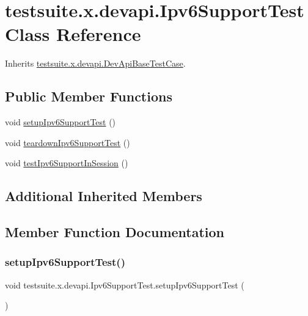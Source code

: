 \hypertarget{classtestsuite_1_1x_1_1devapi_1_1_ipv6_support_test}{}\section{testsuite.\+x.\+devapi.\+Ipv6\+Support\+Test Class Reference}
\label{classtestsuite_1_1x_1_1devapi_1_1_ipv6_support_test}


Inherits \mbox{\hyperlink{classtestsuite_1_1x_1_1devapi_1_1_dev_api_base_test_case}{testsuite.\+x.\+devapi.\+Dev\+Api\+Base\+Test\+Case}}.

\subsection*{Public Member Functions}
\begin{DoxyCompactItemize}
\item 
void \mbox{\hyperlink{classtestsuite_1_1x_1_1devapi_1_1_ipv6_support_test_a38aacbbc480f9b7500c4f727641be981}{setup\+Ipv6\+Support\+Test}} ()
\item 
void \mbox{\hyperlink{classtestsuite_1_1x_1_1devapi_1_1_ipv6_support_test_a34e03da98716f0156b07ebc05bf39dfb}{teardown\+Ipv6\+Support\+Test}} ()
\item 
void \mbox{\hyperlink{classtestsuite_1_1x_1_1devapi_1_1_ipv6_support_test_ad44a8fcc40b066934a89a590ed693517}{test\+Ipv6\+Support\+In\+Session}} ()
\end{DoxyCompactItemize}
\subsection*{Additional Inherited Members}


\subsection{Member Function Documentation}
\mbox{\label{classtestsuite_1_1x_1_1devapi_1_1_ipv6_support_test_a38aacbbc480f9b7500c4f727641be981}} 
\subsubsection{\texorpdfstring{setup\+Ipv6\+Support\+Test()}{setupIpv6SupportTest()}}
{\footnotesize\ttfamily void testsuite.\+x.\+devapi.\+Ipv6\+Support\+Test.\+setup\+Ipv6\+Support\+Test (\begin{DoxyParamCaption}{ }\end{DoxyParamCaption})}

